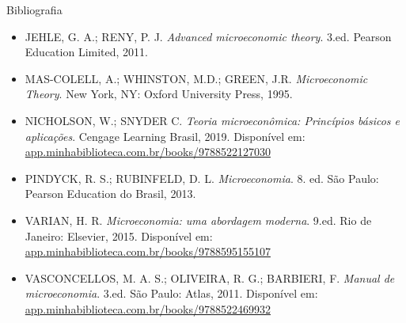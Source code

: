 \documentclass[10pt]{beamer}
\begin{document}
\begin{frame}{Bibliografia}
    \begin{itemize}
        \item JEHLE, G. A.; RENY, P. J. \emph{Advanced microeconomic theory}. 3.ed. Pearson Education Limited, 2011.\medskip
        \item MAS-COLELL, A.; WHINSTON, M.D.; GREEN, J.R. \emph{Microeconomic Theory}. New York, NY: Oxford University Press, 1995.\medskip
        \item NICHOLSON, W.; SNYDER C. \emph{Teoria microeconômica: Princípios básicos e aplicações}. Cengage Learning Brasil, 2019. Disponível em: \href{https://app.minhabiblioteca.com.br/books/9788522127030/}{app.minhabiblioteca.com.br/books/9788522127030}\medskip
        \item PINDYCK, R. S.; RUBINFELD, D. L. \emph{Microeconomia}. 8. ed. São Paulo: Pearson Education do Brasil, 2013.\medskip
        \item VARIAN, H. R. \emph{Microeconomia: uma abordagem moderna}. 9.ed. Rio de Janeiro: Elsevier, 2015. Disponível em: \href{https://app.minhabiblioteca.com.br/books/9788595155107}{app.minhabiblioteca.com.br/books/9788595155107}\medskip
        \item VASCONCELLOS, M. A. S.; OLIVEIRA, R. G.; BARBIERI, F. \emph{Manual de microeconomia}. 3.ed. São Paulo: Atlas, 2011. Disponível em: \href{https://app.minhabiblioteca.com.br/books/9788522469932/}{app.minhabiblioteca.com.br/books/9788522469932}
    \end{itemize}
\end{frame}
\end{document}

